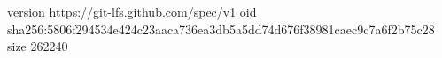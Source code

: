 version https://git-lfs.github.com/spec/v1
oid sha256:5806f294534e424c23aaca736ea3db5a5dd74d676f38981caec9c7a6f2b75c28
size 262240
